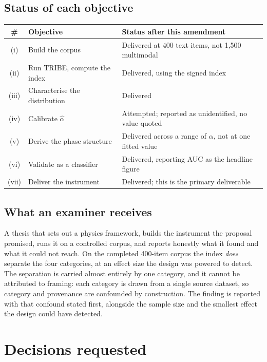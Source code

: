 \documentclass[11pt,a4paper]{article}
\begin{document}
\subsection{Status of each objective}

\begin{center}
\begin{tabular}{@{}clp{7.6cm}@{}}
\toprule
\textbf{\#} & \textbf{Objective} & \textbf{Status after this amendment} \\
\midrule
(i)   & Build the corpus        & Delivered at 400 text items, not 1{,}500 multimodal \\
(ii)  & Run TRIBE, compute the index & Delivered, using the signed index \\
(iii) & Characterise the distribution & Delivered \\
(iv)  & Calibrate $\hat{\alpha}$ & Attempted; reported as unidentified, no value quoted \\
(v)   & Derive the phase structure & Delivered across a range of $\alpha$, not at one fitted value \\
(vi)  & Validate as a classifier & Delivered, reporting AUC as the headline figure \\
(vii) & Deliver the instrument  & Delivered; this is the primary deliverable \\
\bottomrule
\end{tabular}
\end{center}

\subsection{What an examiner receives}

A thesis that sets out a physics framework, builds the instrument the proposal
promised, runs it on a controlled corpus, and reports honestly what it found and
what it could not reach. On the completed 400-item corpus the index
\emph{does} separate the four categories, at an effect size the design was powered to
detect. The separation is carried almost entirely by one category, and it cannot be
attributed to framing: each category is drawn from a single source dataset, so category
and provenance are confounded by construction. The finding is reported with that
confound stated first, alongside the sample size and the smallest effect the design
could have detected.

\section{Decisions requested}
\end{document}
